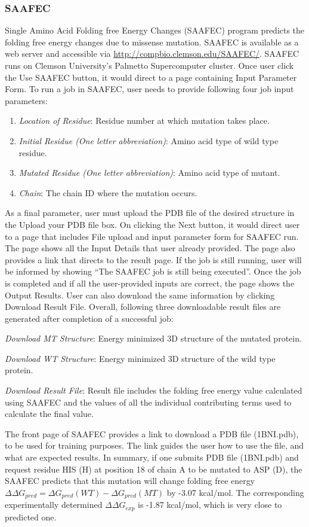 \documentclass[9pt,tutorial]{livecoms}
\begin{document}
\subsubsection{SAAFEC} Single Amino Acid Folding free Energy Changes (SAAFEC) program\cite{getov2016saafec} predicts the folding free energy changes due to missense mutation. SAAFEC is available as a web server and accessible via \url{http://compbio.clemson.edu/SAAFEC/}. SAAFEC runs on Clemson University’s Palmetto Supercomputer cluster. Once user click the Use SAAFEC button, it would direct to a page containing Input Parameter Form. To run a job in SAAFEC, user needs to provide following four job input parameters:
\begin{enumerate}
\item \textit{Location of Residue}: Residue number at which mutation takes place.
\item \textit{Initial Residue (One letter abbreviation)}: Amino acid type of wild type residue.
\item \textit{Mutated Residue (One letter abbreviation)}: Amino acid type of mutant. 
\item \textit{Chain}: The chain ID where the mutation occurs.
\end{enumerate}
As a final parameter, user must upload the PDB file of the desired structure in the Upload your PDB file box. On clicking the Next button, it would direct user to a page that includes File upload and input parameter form for SAAFEC run. The page shows all the Input Details that user already provided. The page also provides a link that directs to the result page. If the job is still running, user will be informed by showing ``The SAAFEC job is still being executed''. Once the job is completed and if all the user-provided inputs are correct, the page shows the Output Results. User can also download the same information by clicking Download Result File. Overall, following three downloadable result files are generated after completion of a successful job:

\textit{Download MT Structure}: Energy minimized 3D structure of the mutated protein.
	
\textit{Download WT Structure}: Energy minimized 3D structure of the wild type protein.

\textit{Download Result File}: Result file includes the folding free energy value calculated using SAAFEC and the values of all the individual contributing terms used to calculate the final value. 


The front page of SAAFEC provides a link to download a PDB file (1BNI.pdb), to be used for training purposes. The link guides the user how to use the file, and what are expected results. In summary, if one submits PDB file (1BNI.pdb) and request residue  HIS (H) at position 18 of chain A to be mutated to ASP (D), the SAAFEC predicts that this mutation will change folding free energy $ \Delta\Delta G_{pred} = \Delta G_{pred}(WT) - \Delta G_{pred}(MT) $ by -3.07 kcal/mol. The corresponding experimentally determined $ \Delta\Delta G_{exp} $ is  -1.87 kcal/mol, which is very close to predicted one.
\end{document}
